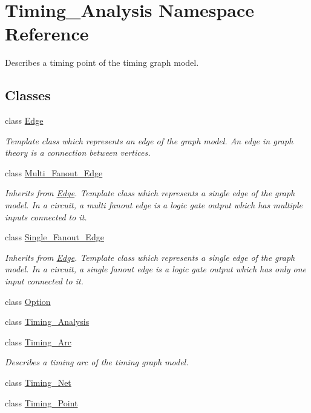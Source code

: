 \hypertarget{namespaceTiming__Analysis}{\section{Timing\-\_\-\-Analysis Namespace Reference}
\label{namespaceTiming__Analysis}
}


Describes a timing point of the timing graph model.  


\subsection*{Classes}
\begin{DoxyCompactItemize}
\item 
class \hyperlink{classTiming__Analysis_1_1Edge}{Edge}
\begin{DoxyCompactList}\small\item\em Template class which represents an edge of the graph model. An edge in graph theory is a connection between vertices. \end{DoxyCompactList}\item 
class \hyperlink{classTiming__Analysis_1_1Multi__Fanout__Edge}{Multi\-\_\-\-Fanout\-\_\-\-Edge}
\begin{DoxyCompactList}\small\item\em Inherits from \hyperlink{classTiming__Analysis_1_1Edge}{Edge}. Template class which represents a single edge of the graph model. In a circuit, a multi fanout edge is a logic gate output which has multiple inputs connected to it. \end{DoxyCompactList}\item 
class \hyperlink{classTiming__Analysis_1_1Single__Fanout__Edge}{Single\-\_\-\-Fanout\-\_\-\-Edge}
\begin{DoxyCompactList}\small\item\em Inherits from \hyperlink{classTiming__Analysis_1_1Edge}{Edge}. Template class which represents a single edge of the graph model. In a circuit, a single fanout edge is a logic gate output which has only one input connected to it. \end{DoxyCompactList}\item 
class \hyperlink{classTiming__Analysis_1_1Option}{Option}
\item 
class \hyperlink{classTiming__Analysis_1_1Timing__Analysis}{Timing\-\_\-\-Analysis}
\item 
class \hyperlink{classTiming__Analysis_1_1Timing__Arc}{Timing\-\_\-\-Arc}
\begin{DoxyCompactList}\small\item\em Describes a timing arc of the timing graph model. \end{DoxyCompactList}\item 
class \hyperlink{classTiming__Analysis_1_1Timing__Net}{Timing\-\_\-\-Net}
\item 
class \hyperlink{classTiming__Analysis_1_1Timing__Point}{Timing\-\_\-\-Point}
\end{DoxyCompactItemize}
